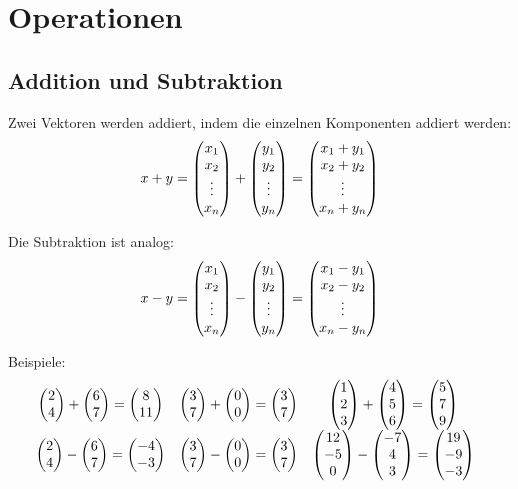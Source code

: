 	\section{Operationen}
	
		\subsection{Addition und Subtraktion}
			Zwei Vektoren werden addiert, indem die einzelnen Komponenten addiert werden:	
			\[x + y = \mvect{x_1 \\ x_2 \\ \vdots \\ x_n} +
			\mvect{y_1 \\ y_2 \\ \vdots \\ y_n} = \mvect{x_1 + y_1 \\ x_2 + y_2 \\ \vdots
			\\ x_n + y_n}\]
		
			Die Subtraktion ist analog:
			\[x - y = \mvect{x_1 \\ x_2 \\ \vdots \\ x_n} - \mvect{y_1 \\ y_2 \\ \vdots \\
			y_n} = \mvect{x_1 - y_1 \\ x_2 - y_2 \\ \vdots \\ x_n - y_n}\]
			
			Beispiele:
			\[\hspace{-6.23pt}
            \begin{array}{ccc}
				\mvect{2\\4}+\mvect{6\\7} = \mvect{8\\11}  &\mvect{3\\7}+\mvect{0\\0}
				= \mvect{3\\7} & \mvect{1\\2\\3}+\mvect{4\\5\\6}=\mvect{5\\7\\9}\\
				\mvect{2\\4}-\mvect{6\\7} = \mvect{-4\\-3} &\mvect{3\\7}-\mvect{0\\0}
				= \mvect{3\\7} & \mvect{12\\-5\\0}-\mvect{-7\\4\\3}=\mvect{19\\-9\\-3}
			\end{array}\]
			
